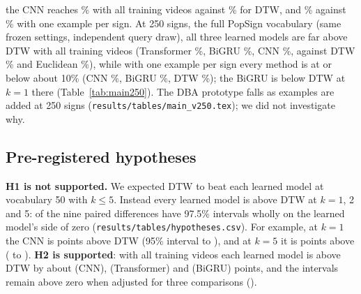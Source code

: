 the CNN reaches \accCnnVHundredKAll\% with all training videos against \accDtwVHundredKAll\% for DTW, and \accCnnVHundredKOne\% against \accDtwVHundredKOne\% with one example per sign. At 250 signs, the full PopSign vocabulary (same frozen settings, independent query draw), all three learned models are far above DTW with all training videos (Transformer \accTransVTwoFiftyKAll\%, BiGRU \accGruVTwoFiftyKAll\%, CNN \accCnnVTwoFiftyKAll\%, against DTW \accDtwVTwoFiftyKAll\% and Euclidean \accEuclidVTwoFiftyKAll\%), while with one example per sign every method is at or below about 10\% (CNN \accCnnVTwoFiftyKOne\%, BiGRU \accGruVTwoFiftyKOne\%, DTW \accDtwVTwoFiftyKOne\%); the BiGRU is below DTW at $k=1$ there (Table~\ref{tab:main250}). The DBA prototype falls as examples are added at 250 signs (\texttt{results/tables/main\_v250.tex}); we did not investigate why.

\subsection{Pre-registered hypotheses}
\textbf{H1 is not supported.} We expected DTW to beat each learned model at vocabulary 50 with $k\le5$. Instead every learned
model is above DTW at $k=1$, 2 and 5: \nHOneBelowZero{} of the nine paired differences have 97.5\% intervals wholly on the learned model's side of zero (\texttt{results/tables/hypotheses.csv}). For example, at $k=1$ the CNN is \difCnnVFiftyKOne{} points above DTW
(95\% interval \difLoCnnVFiftyKOne{} to \difHiCnnVFiftyKOne{}), and at $k=5$ it is \difCnnVFiftyKFive{} points above
(\difLoCnnVFiftyKFive{} to \difHiCnnVFiftyKFive{}). \textbf{H2 is supported}: with all training videos each learned model is
above DTW by about \difCnnVFiftyKAll{} (CNN), \difTransVFiftyKAll{} (Transformer) and \difGruVFiftyKAll{} (BiGRU) points, and the intervals remain above zero when adjusted for three comparisons (\hTwoAdjSupported).

